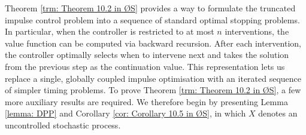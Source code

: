Theorem \ref{trm: Theorem 10.2 in ØS} provides a way to formulate the truncated impulse control problem into a sequence of standard optimal stopping problems. In particular, when the controller is restricted to at most $n$ interventions, the value function can be computed via backward recursion. After each intervention, the controller optimally selects when to intervene next and takes the solution from the previous step as the continuation value. This representation lets us replace a single, globally coupled impulse optimisation with an iterated sequence of simpler timing problems. To prove Theorem \ref{trm: Theorem 10.2 in ØS}, a few more auxiliary results are required. We therefore begin by presenting Lemma \ref{lemma: DPP} and Corollary \ref{cor: Corollary 10.5 in ØS}, in which $X$ denotes an uncontrolled stochastic process.

